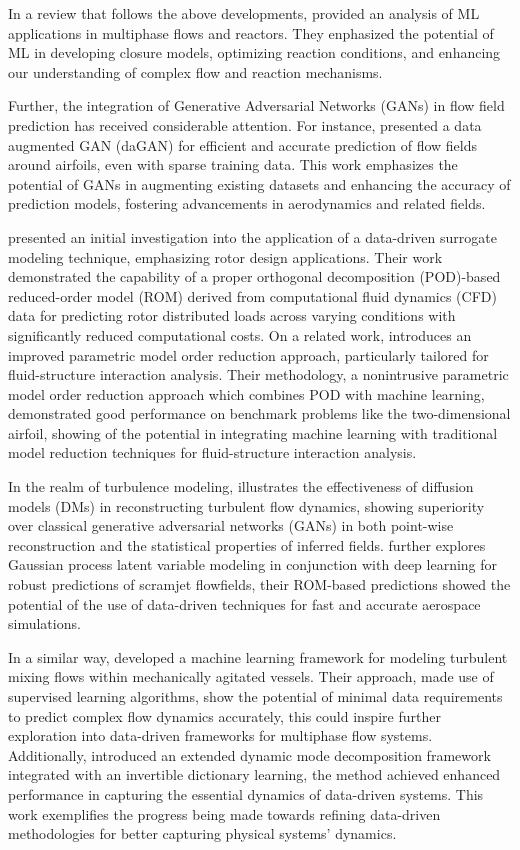 In a review that follows the above developments,  provided an analysis of ML applications in multiphase flows and reactors. They enphasized the potential of ML in developing closure models, optimizing reaction conditions, and enhancing our understanding of complex flow and reaction mechanisms.

Further, the integration of Generative Adversarial Networks (GANs) in flow field prediction has received considerable attention. For instance,  presented a data augmented GAN (daGAN) for efficient and accurate prediction of flow fields around airfoils, even with sparse training data. This work emphasizes the potential of GANs in augmenting existing datasets and enhancing the accuracy of prediction models, fostering advancements in aerodynamics and related fields.

 presented an initial investigation into the application of a data-driven surrogate modeling technique, emphasizing rotor design applications. Their work demonstrated the capability of a proper orthogonal decomposition (POD)-based reduced-order model (ROM) derived from computational fluid dynamics (CFD) data for predicting rotor distributed loads across varying conditions with significantly reduced computational costs. On a related work,  introduces an improved parametric model order reduction approach, particularly tailored for fluid-structure interaction analysis. Their methodology, a nonintrusive parametric model order reduction approach which combines POD with machine learning, demonstrated good performance on benchmark problems like the two-dimensional airfoil, showing of the potential in integrating machine learning with traditional model reduction techniques for fluid-structure interaction analysis.

In the realm of turbulence modeling,  illustrates the effectiveness of diffusion models (DMs) in reconstructing turbulent flow dynamics, showing superiority over classical generative adversarial networks (GANs) in both point-wise reconstruction and the statistical properties of inferred fields.  further explores Gaussian process latent variable modeling in conjunction with deep learning for robust predictions of scramjet flowfields, their ROM-based predictions showed the potential of the use of data-driven techniques for fast and accurate aerospace simulations.

In a similar way,  developed a machine learning framework for modeling turbulent mixing flows within mechanically agitated vessels. Their approach, made use of supervised learning algorithms, show the potential of minimal data requirements to predict complex flow dynamics accurately, this could inspire further exploration into data-driven frameworks for multiphase flow systems. Additionally, \cite{Jin2024} introduced an extended dynamic mode decomposition framework integrated with an invertible dictionary learning, the method achieved enhanced performance in capturing the essential dynamics of data-driven systems. This work exemplifies the progress being made towards refining data-driven methodologies for better capturing physical systems' dynamics.

